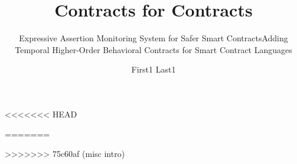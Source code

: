 \documentclass[acmsmall,review,anonymous]{acmart}\settopmatter{printfolios=true,printccs=false,printacmref=false}
\begin{document}
\title[Short Title]{Contracts for Contracts}         %
<<<<<<< HEAD
\subtitle{Expressive Assertion Monitoring System for Safer Smart Contracts}                     %
=======
\subtitle{Adding Temporal Higher-Order Behavioral Contracts for Smart Contract Languages}                     %
>>>>>>> 75c60af (misc intro)



\author{First1 Last1}
\end{document}
